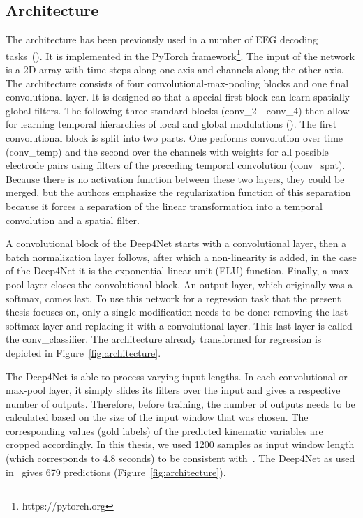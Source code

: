 \subsection{Architecture}\label{subsec:architecture}
The architecture has been previously used in a number of EEG decoding tasks~(\cite{Hammer-2021, schirrmeister-deep-2017, hartmann-hierarchical-2018}).
It is implemented in the PyTorch framework\footnote{https://pytorch.org}.
The input of the network is a 2D array with time-steps along one axis and channels along the other axis.
The architecture consists of four convolutional-max-pooling blocks and one final convolutional layer.
It is designed so that a special first block can learn spatially global filters.
The following three standard blocks (conv\_2 - conv\_4) then allow for learning temporal hierarchies of local and global modulations (\cite{schirrmeister-deep-2017}).
The first convolutional block is split into two parts.
One performs convolution over time (conv\_temp) and the second over the channels with weights for all possible electrode pairs using filters of the preceding temporal convolution (conv\_spat).
Because there is no activation function between these two layers, they could be merged, but the authors emphasize the regularization function of this separation because it forces a separation of the linear transformation into a temporal convolution and a spatial filter.

A convolutional block of the Deep4Net starts with a convolutional layer, then a batch normalization layer follows, after which a non-linearity is added, in the case of the Deep4Net it is the exponential linear unit (ELU) function.
Finally, a max-pool layer closes the convolutional block.
An output layer, which originally was a softmax, comes last.
To use this network for a regression task that the present thesis focuses on, only a single modification needs to be done: removing the last softmax layer and replacing it with a convolutional layer.
This last layer is called the conv\_classifier.
The architecture already transformed for regression is depicted in Figure~\ref{fig:architecture}.

The Deep4Net is able to process varying input lengths. In each convolutional or max-pool layer, it simply slides its filters over the input and gives a respective number of outputs.
Therefore, before training, the number of outputs needs to be calculated based on the size of the input window that was chosen.
The corresponding values (gold labels) of the predicted kinematic variables are cropped accordingly.
In this thesis, we used 1200 samples as input window length (which corresponds to 4.8 seconds) to be consistent with~\cite{Hammer-2021}. The Deep4Net as used in~\cite{Hammer-2021} gives 679 predictions (Figure~\ref{fig:architecture}).

